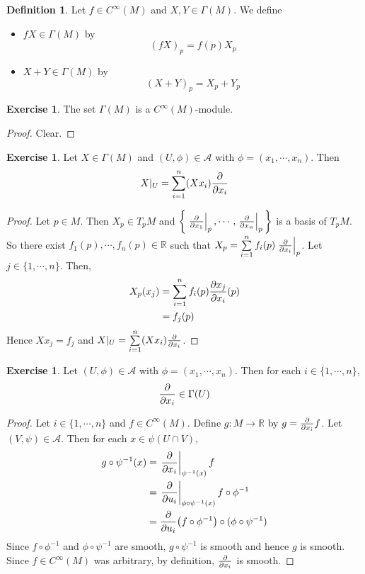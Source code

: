 \documentclass[12pt]{amsart}
\theoremstyle{definition}
\newtheorem{defn}[definition]{Definition}
\theoremstyle{definition}
\newtheorem{ex}[definition]{Exercise}
\newcommand{\Gam}{\Gamma}
\newcommand{\R}{\mathbb{R}}
\newcommand{\MA}{\mathcal{A}}
\begin{document}
	\begin{defn}
	Let $f \in C^{\infty}(M)$ and $X,Y \in \Gam(M)$. We define 
	\begin{itemize}
	\item $fX \in \Gam(M)$ by $$(fX)_p = f(p)X_p$$
	\item $X+Y \in \Gam(M)$ by $$(X+Y)_p = X_p+Y_p$$
	\end{itemize}
	\end{defn}
	
	\begin{ex}
	The set $\Gam(M)$ is a $C^{\infty}(M)$-module.
	\end{ex}
	
	\begin{proof}
	Clear.
	\end{proof}

	\begin{ex}
		Let $X \in \Gam(M)$ and $(U, \phi) \in \MA$ with $\phi = (x_1, \cdots, x_n)$. Then $$X|_U = \sum_{i=1}^n (Xx_i) \pdv{x_i}$$ 
	\end{ex}

	\begin{proof}
		Let $p \in M$. Then $X_p \in T_pM$ and $\bigg \{ \eval{\pdv{x_{1}}}_{p}, \cdots, \eval{\pdv{x_{n}}}_{p} \bigg \}$ is a basis of $T_pM$. So there exist $f_1(p), \cdots, f_n(p) \in \R$ such that $X_p = \sum\limits_{i=1}^n f_i(p) \eval{\pdv{x_i}}_{p}$. Let $j \in \{1, \cdots, n\}$. Then,
		\begin{align*}
			X_p(x_j) 
			&= \sum\limits_{i=1}^n f_i(p) {\pdv{x_j}{x_i}}(p) \\
			&= f_j(p) \\
		\end{align*} 
		Hence $Xx_j = f_j$ and $X|_U = \sum\limits_{i=1}^n (Xx_i) \pdv{x_i}$.
	\end{proof}
	
	\begin{ex}
	Let $(U, \phi) \in \MA$ with $\phi = (x_1, \cdots, x_n)$. Then for each $i \in \{1, \cdots, n\}$, $$\pdv{x_i} \in \Gam(U)$$
	\end{ex}
	
	\begin{proof}
	Let $i \in \{1, \cdots, n\}$ and $f \in C^{\infty}(M)$. Define $g: M \rightarrow \R$ by $g = \pdv{x_i} f$. Let $(V, \psi) \in \MA$. Then for each $x \in \psi(U \cap V)$, 
	\begin{align*}
	g \circ \psi^{-1}(x) 
	&= \eval{\pdv{x_i}}_{\psi^{-1}(x)}f \\
	&= \eval{\pdv{u_i}}_{\phi \circ \psi^{-1}(x)}f \circ \phi^{-1}  \\
	&= \pdv{u_i}(f \circ \phi^{-1}) \circ (\phi \circ \psi^{-1}) \\
\end{align*}	 
	Since $f \circ \phi^{-1}$ and $\phi \circ \psi^{-1}$ are smooth, $g \circ \psi^{-1}$ is smooth and hence $g$ is smooth. Since $f \in C^{\infty}(M)$ was arbitrary, by definition, $\pdv{x_i}$ is smooth. 
	\end{proof}
	
\end{document}
